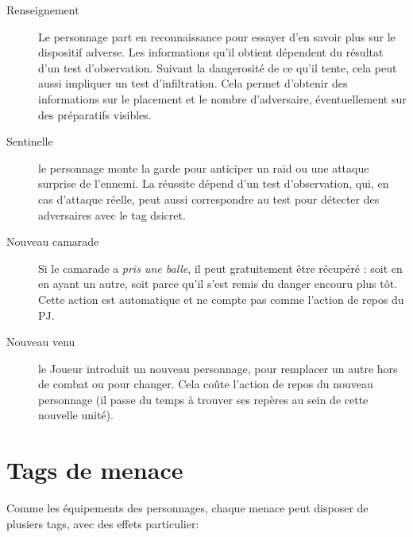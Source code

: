 \documentclass{report}
\begin{document}
\begin{multicols}{2}
\begin{description}
    \item[Renseignement] Le personnage part en reconnaissance pour essayer d'en savoir plus sur le dispositif adverse. Les informations qu'il obtient dépendent du résultat d'un test d'observation. Suivant la dangerosité de ce qu'il tente, cela peut aussi impliquer un test d'infiltration. Cela permet d'obtenir des informations sur le placement et le nombre d'adversaire, éventuellement sur des préparatifs visibles. 
    \item[Sentinelle]le personnage monte la garde pour anticiper un raid ou une attaque surprise de l'ennemi. La réussite dépend d'un test d'observation, qui, en cas d'attaque réelle, peut aussi correspondre au test pour détecter des adversaires avec le tag dsicret.
    \item[Nouveau camarade]Si le camarade a \emph{pris une balle}, il peut gratuitement être récupéré : soit en en ayant un autre, soit parce qu'il s'est remis du danger encouru plus tôt. Cette action est automatique et ne compte pas comme l'action de repos du PJ.
    \item[Nouveau venu]le Joueur introduit un nouveau personnage, pour remplacer un autre hors de combat ou pour changer. Cela coûte l'action de repos du nouveau personnage (il passe du temps à trouver ses repères au sein de cette nouvelle unité).
\end{description}


\section{Tags de menace}
Comme les équipements des personnages, chaque menace peut disposer de plusiers tags, avec des effets particulier:


\end{multicols}
\end{document}
